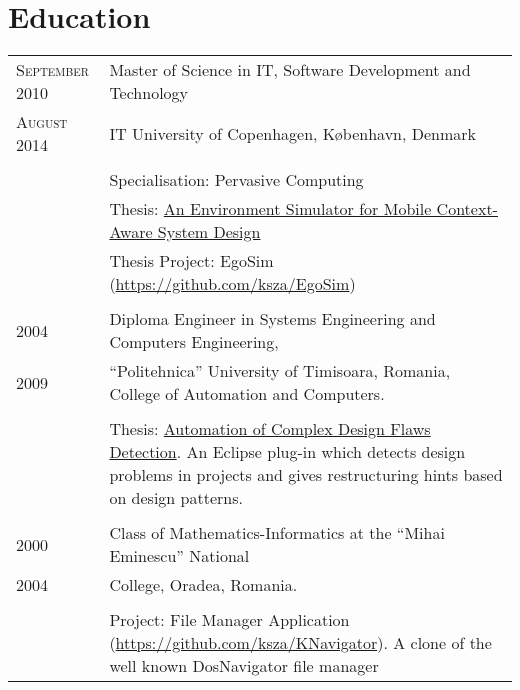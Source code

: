 \documentclass[a4paper,10pt]{article}
\begin{document}
\section{Education}
\begin{tabular}{p{2.5cm}|p{11cm}}
\raggedleft \textsc{September 2010} & Master of Science in IT, Software Development and Technology
\\ \raggedleft \textsc{August 2014} & IT University of Copenhagen,
København, Denmark \\ \\
& \footnotesize{Specialisation: Pervasive Computing} \\
& \footnotesize{Thesis: \href{http://karolyszanto.ro/MastersThesis/An%20Environment%20Simulator%20for%20Mobile%20Context-Aware%20System%20Design.pdf}{An Environment Simulator for Mobile
Context-Aware System Design}} \\
& \footnotesize{Thesis Project: EgoSim (\url{https://github.com/ksza/EgoSim})} \\
 \multicolumn{2}{c}{} \\
\raggedleft \textsc{2004} & Diploma Engineer in Systems Engineering and
Computers Engineering, \\ \raggedleft \textsc{2009} & ``Politehnica'' University of Timisoara, Romania, College of Automation and
Computers.\\ \\
& \footnotesize{Thesis: \href{http://karolyszanto.ro/Diploma/KarolySzanto_thesis.pdf}{Automation of Complex Design Flaws Detection}. An Eclipse plug-in which detects design
 problems in projects and gives restructuring hints based on design patterns.} \\
\multicolumn{2}{c}{} \\ 
\raggedleft \textsc{2000} & Class of Mathematics-Informatics at the
``Mihai Eminescu'' National \\ \raggedleft \textsc{2004} &
College, Oradea, Romania.\\ \\
& \footnotesize{Project: File Manager Application (\url{https://github.com/ksza/KNavigator}). A clone of the well known DosNavigator file manager} \\
\end{tabular}

\end{document}
